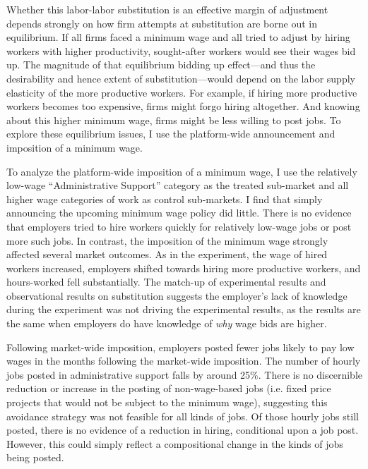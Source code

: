 \documentclass[AER]{AEA}
\begin{document}
Whether this labor-labor substitution is an effective margin of adjustment depends strongly on how firm attempts at substitution are borne out in equilibrium.
If all firms faced a minimum wage and all tried to adjust by hiring workers with higher productivity, sought-after workers would see their wages bid up. 
The magnitude of that equilibrium bidding up effect---and thus the desirability and hence extent of substitution---would depend on the labor supply elasticity of the more productive workers. 
For example, if hiring more productive workers becomes too expensive, firms might forgo hiring altogether.
And knowing about this higher minimum wage, firms might be less willing to post jobs.
To explore these equilibrium issues, I use the platform-wide announcement and imposition of a minimum wage.     

To analyze the platform-wide imposition of a minimum wage, I use the relatively low-wage ``Administrative Support'' category as the treated sub-market and all higher wage categories of work as control sub-markets. 
I find that simply announcing the upcoming minimum wage policy did little. 
There is no evidence that employers tried to hire workers quickly for relatively low-wage jobs or post more such jobs.
In contrast, the imposition of the minimum wage strongly affected several market outcomes.
As in the experiment, the wage of hired workers increased, employers shifted towards hiring more productive workers, and hours-worked fell substantially. 
The match-up of experimental results and observational results on substitution suggests the employer's lack of knowledge during the experiment was not driving the experimental results, as the results are the same when employers do have knowledge of \emph{why} wage bids are higher. 

Following market-wide imposition, employers posted fewer jobs likely to pay low wages in the months following the market-wide imposition.
The number of hourly jobs posted in administrative support falls by around 25\%.
There is no discernible reduction or increase in the posting of non-wage-based jobs (i.e. fixed price projects that would not be subject to the minimum wage), suggesting this avoidance strategy was not feasible for all kinds of jobs.
Of those hourly jobs still posted, there is no evidence of a reduction in hiring, conditional upon a job post.
However, this could simply reflect a compositional change in the kinds of jobs being posted.
\end{document}

